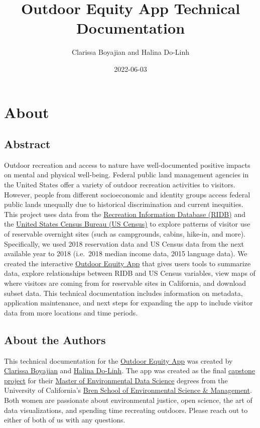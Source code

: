 \documentclass[
]{book}
\title{Outdoor Equity App Technical Documentation}
\author{Clarissa Boyajian and Halina Do-Linh}
\date{2022-06-03}
\begin{document}
\maketitle

{
\setcounter{tocdepth}{1}
\tableofcontents
}
\hypertarget{about}{%
\chapter{About}\label{about}}

\hypertarget{abstract}{%
\section{Abstract}\label{abstract}}

Outdoor recreation and access to nature have well-documented positive impacts on mental and physical well-being. Federal public land management agencies in the United States offer a variety of outdoor recreation activities to visitors. However, people from different socioeconomic and identity groups access federal public lands unequally due to historical discrimination and current inequities. This project uses data from the \href{https://ridb.recreation.gov/landing}{Recreation Information Database (RIDB)} and the \href{https://www.census.gov/data.html}{United States Census Bureau (US Census)} to explore patterns of visitor use of reservable overnight sites (such as campgrounds, cabins, hike-in, and more). Specifically, we used 2018 reservation data and US Census data from the next available year to 2018 (i.e.~2018 median income data, 2015 language data). We created the interactive \href{https://shinyapps.bren.ucsb.edu/oe_app/}{Outdoor Equity App} that gives users tools to summarize data, explore relationships between RIDB and US Census variables, view maps of where visitors are coming from for reservable sites in California, and download subset data. This technical documentation includes information on metadata, application maintenance, and next steps for expanding the app to include visitor data from more locations and time periods.

\hypertarget{about-the-authors}{%
\section{About the Authors}\label{about-the-authors}}

This technical documentation for the \href{https://shinyapps.bren.ucsb.edu/oe_app/}{Outdoor Equity App} was created by \href{https://cboyajian.github.io/}{Clarissa Boyajian} and \href{https://hdolinh.github.io/}{Halina Do-Linh}. The app was created as the final \href{https://bren.ucsb.edu/projects/visualizing-visitor-use-trends-california-campsites-explore-equitable-access}{capstone project} for their \href{https://bren.ucsb.edu/masters-programs/master-environmental-data-science}{Master of Environmental Data Science} degrees from the University of California's \href{https://bren.ucsb.edu/}{Bren School of Environmental Science \& Management}. Both women are passionate about environmental justice, open science, the art of data visualizations, and spending time recreating outdoors. Please reach out to either of both of us with any questions.
\end{document}
